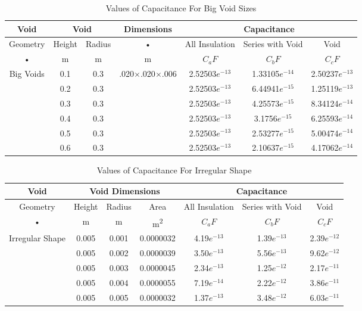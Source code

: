 \begin{table}[h!]
\caption{Values of Capacitance For Big Void Sizes}
\label{table:Values of Capacitance For Big Void Sizes}
\centering
\begin{tabular}{|c|c|c|c|c|c|c|}
\hline 
Void & \multicolumn{2}{c|}{Void} & Dimensions & \multicolumn{3}{c|}{Capacitance}  \\ 
\hline 
Geometry & Height & Radius & • &  All Insulation & Series with Void & Void \\  
• & m & m & m & $C_a F$ & $C_b F$ & $C_c F$ \\ \hline \hline
\multirow{6}{*}{Big Voids}&0.1	&0.3&.020$\times$.020$\times$.006	&2.52503$e^{-13}$	&1.33105$e^{-14}$	&2.50237$e^{-13}$\\ \cline{2-7}
		 &0.2	&0.3& 								&2.52503$e^{-13}$	&6.44941$e^{-15}$	&1.25119$e^{-13}$\\ \cline{2-7}
 		 &0.3	&0.3&								&2.52503$e^{-13}$	&4.25573$e^{-15}$	&8.34124$e^{-14}$\\ \cline{2-7}
 		 &0.4	&0.3& 								&2.52503$e^{-13}$	&3.1756$e^{-15}$	&6.25593$e^{-14}$\\ \cline{2-7}
 		 &0.5	&0.3& 								&2.52503$e^{-13}$	&2.53277$e^{-15}$	&5.00474$e^{-14}$\\ \cline{2-7}
 		 &0.6	&0.3& 								&2.52503$e^{-13}$	&2.10637$e^{-15}$	&4.17062$e^{-14}$\\ \hline
\end{tabular} 
\end{table}


\begin{table}[h!]
\caption{Values of Capacitance For Irregular Shape}
\label{table:Values of Capacitance For Irregular Shape}
\centering
\begin{tabular}{|c|c|c|c|c|c|c|}
\hline 
Void & \multicolumn{3}{c|}{Void Dimensions} & \multicolumn{3}{c|}{Capacitance}  \\ 
\hline 
Geometry & Height & Radius & Area &  All Insulation & Series with Void & Void \\  
• & m & m & m\textsuperscript{2} & $C_a F$ & $C_b F$ & $C_c F$ \\ \hline \hline
\multirow{5}{*}{Irregular Shape}&0.005	&0.001	&0.0000032	&4.19$e^{-13}$	&1.39$e^{-13}$	&2.39$e^{-12}$ \\ \cline{2-7}
				&0.005	&0.002	&0.0000039	&3.50$e^{-13}$	&5.56$e^{-13}$	&9.62$e^{-12}$ \\ \cline{2-7}
 				&0.005	&0.003	&0.0000045	&2.34$e^{-13}$	&1.25$e^{-12}$	&2.17$e^{-11}$ \\ \cline{2-7}
 				&0.005	&0.004	&0.0000055	&7.19$e^{-14}$	&2.22$e^{-12}$	&3.86$e^{-11}$ \\ \cline{2-7}
 				&0.005	&0.005	&0.0000032	&1.37$e^{-13}$	&3.48$e^{-12}$	&6.03$e^{-11}$ \\ \hline
\end{tabular} 
\end{table}

